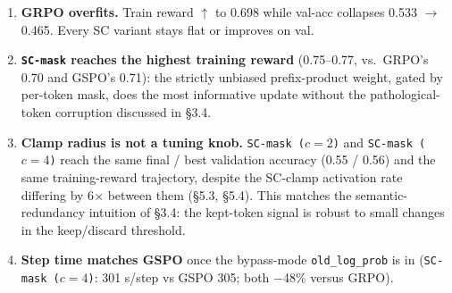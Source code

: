 \documentclass[11pt,a4paper]{article}
\theoremstyle{remark}
\begin{document}
\begin{table}[H]\centering\small
\setlength{\tabcolsep}{4pt}
\end{table}

\begin{enumerate}[leftmargin=1.2em]
\item \textbf{GRPO overfits.} Train reward $\uparrow$ to 0.698 while val-acc collapses 0.533 $\rightarrow$ 0.465. Every SC variant stays flat or improves on val.
\item \textbf{\texttt{SC-mask} reaches the highest training reward} (0.75--0.77, vs.\ GRPO's 0.70 and GSPO's 0.71): the strictly unbiased prefix-product weight, gated by per-token mask, does the most informative update without the pathological-token corruption discussed in §3.4.
\item \textbf{Clamp radius is not a tuning knob.} \texttt{SC-mask ($c{=}2$)} and \texttt{SC-mask ($c{=}4$)} reach the same final / best validation accuracy (0.55 / 0.56) and the same training-reward trajectory, despite the SC-clamp activation rate differing by 6$\times$ between them (§5.3, §5.4). This matches the semantic-redundancy intuition of §3.4: the kept-token signal is robust to small changes in the keep/discard threshold.
\item \textbf{Step time matches GSPO} once the bypass-mode \texttt{old\_log\_prob} is in (\texttt{SC-mask ($c{=}4$)}: 301 s/step vs GSPO 305; both $-$48\% versus GRPO).
\end{enumerate}
\end{document}
